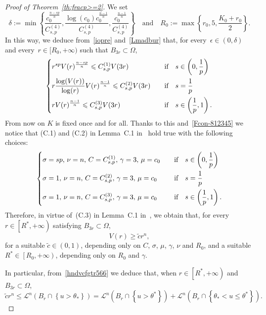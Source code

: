 \documentclass[12pt]{article}
\numberwithin{equation}{section}
\renewcommand{\leq}{\leqslant}
\renewcommand{\geq}{\geqslant}
\begin{document}
\begin{proof}[Proof of Theorem~\ref{th:fracp>=2}]
We set 
\begin{equation*}
\delta :=\min \left\lbrace \frac{c_0^{\frac{n-sp}{n}}}{C_{s,p}^{(4)}},\frac{\log(c_0)c_0^{\frac{n-1}{n}}}{C_{s,p}^{(4)}}, \frac{c_0^\frac{n-1}{n}}{C_{s,p}^{(4)}}\right\rbrace \quad\mbox{and}\quad R_0:=\max\left\lbrace r_0, 5, \frac{K_0+r_0}{2} \right\rbrace.
\end{equation*}
In this way, we deduce from~\eqref{iopre} and~\eqref{Lmadbur}
that, for every~$\epsilon\in (0,\delta)$ and
every~$r\in [R_0,+\infty)$ such that $B_{3r}\subset \Omega$,   
\begin{equation*}
\begin{dcases}
r^{sp} V(r)^{\frac{n-sp}{n}}\leq C_{s,p}^{(1)} V(3r)\quad &\mbox{if}\quad s\in \left(0,\frac{1}{p}\right)\\
r\frac{\log(V(r))}{\log(r)}V(r)^{\frac{n-1}{n}} \leq  C_{s,p}^{(2)}V(3r)\quad &\mbox{if}\quad s=\frac{1}{p}\\
rV(r)^{\frac{n-1}{n}}\leq C_{s,p}^{(3)} V(3r)\quad &\mbox{if}\quad  s\in \left(\frac{1}{p},1\right).
\end{dcases}
\end{equation*}
From now on $K$ is fixed once and for all. Thanks to this and~\eqref{Fcon-812345} we notice that (C.1) and (C.2) in Lemma~C.1 in~\cite{DFVERPP} hold true with the following choices:
\begin{equation*}
\begin{dcases}
\sigma=sp,\,\nu=n,\,C=C_{s,p}^{(1)},\,\gamma=3,\,\mu=c_0 \quad &\mbox{if}\quad s\in \left(0,\frac{1}{p}\right)\\ 
\sigma=1,\,\nu=n,\,C=C_{s,p}^{(2)},\,\gamma=3,\,\mu=c_0 \quad &\mbox{if}\quad s=\frac{1}{p}\\
\sigma=1,\,\nu=n,\,C=C_{s,p}^{(3)},\,\gamma=3,\,\mu=c_0 \quad &\mbox{if}\quad s\in \left(\frac{1}{p},1\right).
\end{dcases}
\end{equation*}
Therefore, in virtue of~(C.3) in Lemma~C.1 in~\cite{DFVERPP}, we obtain that, for every $r\in \left[R^*,+\infty\right)$ satisfying $B_{3r}\subset\Omega$,
\begin{equation}\label{hndvcfgtr566}
V(r)\geq \tilde{c}r^n,
\end{equation} 
for a suitable $\tilde{c}\in (0,1)$,
depending only on $C$, $\sigma$, $\mu$, $\gamma$, $\nu$ and $R_0$, and a suitable $R^*\in\left[R_0,+\infty\right)$, depending only on $R_0$ and $\gamma$.

In particular, from~\eqref{hndvcfgtr566} we deduce that, when $r\in \left[R^*,+\infty\right)$ and $B_{3r} \subset\Omega$,
\begin{equation}\label{euno}
\tilde{c} r^n\leq \mathcal{L}^n(B_r\cap \left\lbrace u>\theta_*\right\rbrace)=\mathcal{L}^n(B_r\cap \left\lbrace u>\theta^*\right\rbrace)+\mathcal{L}^n(B_r\cap \left\lbrace \theta_*<u\leq \theta^*\right\rbrace).
\end{equation}


\end{proof}
\end{document}
